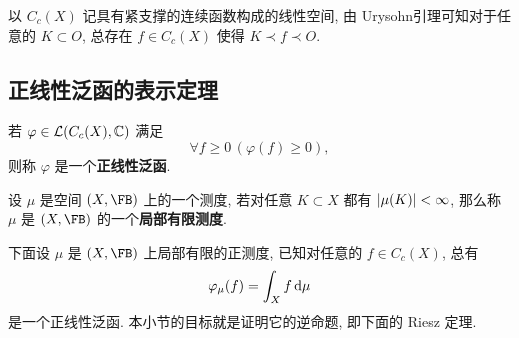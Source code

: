 	以 $ C_c(X) $ 记具有紧支撑的连续函数构成的线性空间, 由 Urysohn引理可知对于任意的 $ K\subset O $, 总存在 $ f\in C_c(X) $ 使得 $ K\prec f\prec O $.

	\subsection{正线性泛函的表示定理}

	\begin{Definition}[正线性泛函]
		若 $ \varphi\in\mathcal{L}(C_c(X),\mathbb{C}) $ 满足
		\[
			\forall f\geqslant 0\,(\varphi(f)\geqslant 0),
		\]
		则称 $ \varphi $ 是一个\textbf{正线性泛函}.
	\end{Definition}

	\begin{Definition}[局部有限测度]
		设 $ \mu $ 是空间 $ (X,\FB) $ 上的一个测度, 若对任意 $ K\subset X $ 都有 $ \left| \mu(K) \right| <\infty $, 那么称 $ \mu $ 是 $ (X,\FB) $ 的一个\textbf{局部有限测度}.
	\end{Definition}

	下面设 $ \mu $ 是 $ (X,\FB) $ 上局部有限的正测度, 已知对任意的 $ f\in C_c(X) $, 总有
	\[
		\varphi_\mu(f)=\int_Xf\,\mathrm{d}\mu
	\]
	是一个正线性泛函. 本小节的目标就是证明它的逆命题, 即下面的 Riesz 定理.

